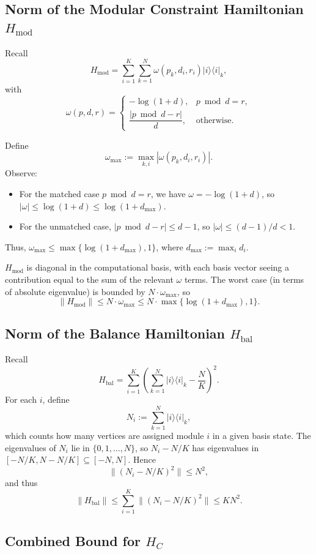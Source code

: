 \documentclass[11pt]{article}
\begin{document}
\subsection{Norm of the Modular Constraint Hamiltonian $H_{\text{mod}}$}

Recall
\[
  H_{\text{mod}} = \sum_{i=1}^K \sum_{k=1}^N \omega(p_k,d_i,r_i) |i\rangle\langle i|_k,
\]
with
\[
  \omega(p,d,r) =
  \begin{cases}
    -\log(1+d), & p \bmod d = r,\\[3pt]
    \dfrac{|p\bmod d - r|}{d}, & \text{otherwise}.
  \end{cases}
\]

Define
\[
  \omega_{\max} := \max_{k,i} |\omega(p_k,d_i,r_i)|.
\]
Observe:
\begin{itemize}
  \item For the matched case $p\bmod d = r$, we have $\omega = -\log(1+d)$, so $|\omega|\le \log(1+d) \le \log(1 + d_{\max})$.
  \item For the unmatched case, $|p\bmod d - r|\le d-1$, so $|\omega|\le (d-1)/d < 1$.
\end{itemize}
Thus, $\omega_{\max}\le \max\{\log(1+d_{\max}),1\}$, where $d_{\max} := \max_i d_i$.

$H_{\text{mod}}$ is diagonal in the computational basis, with each basis vector seeing a contribution equal to the sum of the relevant $\omega$ terms. The worst case (in terms of absolute eigenvalue) is bounded by $N\cdot \omega_{\max}$, so
\[
  \|H_{\text{mod}}\| \le N\cdot \omega_{\max} \le N\cdot \max\{\log(1+d_{\max}),1\}.
\]

\subsection{Norm of the Balance Hamiltonian $H_{\text{bal}}$}

Recall
\[
  H_{\text{bal}} = \sum_{i=1}^K \left(\sum_{k=1}^N |i\rangle\langle i|_k - \frac{N}{K}\right)^2.
\]
For each $i$, define
\[
  N_i := \sum_{k=1}^N |i\rangle\langle i|_k,
\]
which counts how many vertices are assigned module $i$ in a given basis state. The eigenvalues of $N_i$ lie in $\{0,1,\dots,N\}$, so $N_i - N/K$ has eigenvalues in $[-N/K,N - N/K] \subseteq [-N,N]$. Hence
\[
  \|(N_i - N/K)^2\| \le N^2,
\]
and thus
\[
  \|H_{\text{bal}}\| \le \sum_{i=1}^K \|(N_i - N/K)^2\| \le K N^2.
\]

\subsection{Combined Bound for $H_C$}
\end{document}
